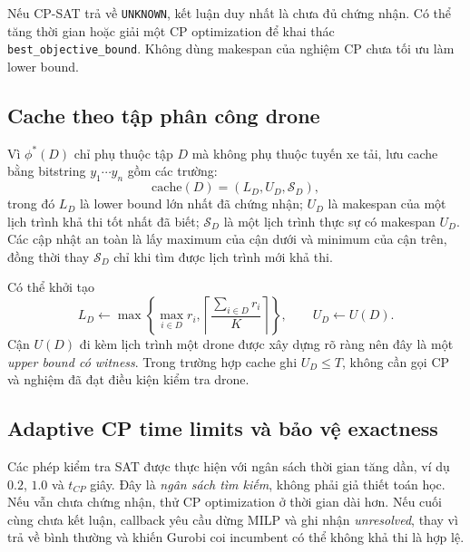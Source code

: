 \documentclass[11pt,a4paper]{article}
\theoremstyle{definition}
\theoremstyle{plain}
\theoremstyle{remark}
\newcommand{\opt}{\phi^*}
\begin{document}
Nếu CP-SAT trả về \texttt{UNKNOWN}, kết luận duy nhất là chưa đủ chứng nhận. Có thể tăng thời gian hoặc giải một CP optimization để khai thác \texttt{best\_objective\_bound}. Không dùng makespan của nghiệm CP chưa tối ưu làm lower bound.

\subsection{Cache theo tập phân công drone}
Vì $\opt(D)$ chỉ phụ thuộc tập $D$ mà không phụ thuộc tuyến xe tải, lưu cache bằng bitstring $y_1\cdots y_n$ gồm các trường:
\begin{equation}
\mathrm{cache}(D)=(L_D,U_D,\mathcal S_D),
\end{equation}
trong đó $L_D$ là lower bound lớn nhất đã chứng nhận; $U_D$ là makespan của một lịch trình khả thi tốt nhất đã biết; $\mathcal S_D$ là một lịch trình thực sự có makespan $U_D$. Các cập nhật an toàn là lấy maximum của cận dưới và minimum của cận trên, đồng thời thay $\mathcal S_D$ chỉ khi tìm được lịch trình mới khả thi.

Có thể khởi tạo
\begin{equation}
L_D\leftarrow\max\left\{\max_{i\in D}r_i,\left\lceil\frac{\sum_{i\in D}r_i}{K}\right\rceil\right\},
\qquad U_D\leftarrow U(D).
\end{equation}
Cận $U(D)$ đi kèm lịch trình một drone được xây dựng rõ ràng nên đây là một \emph{upper bound có witness}. Trong trường hợp cache ghi $U_D\le T$, không cần gọi CP và nghiệm đã đạt điều kiện kiểm tra drone.

\subsection{Adaptive CP time limits và bảo vệ exactness}
Các phép kiểm tra SAT được thực hiện với ngân sách thời gian tăng dần, ví dụ $0.2$, $1.0$ và $t_{CP}$ giây. Đây là \emph{ngân sách tìm kiếm}, không phải giả thiết toán học. Nếu vẫn chưa chứng nhận, thử CP optimization ở thời gian dài hơn. Nếu cuối cùng chưa kết luận, callback yêu cầu dừng MILP và ghi nhận \emph{unresolved}, thay vì trả về bình thường và khiến Gurobi coi incumbent có thể không khả thi là hợp lệ.
\end{document}
